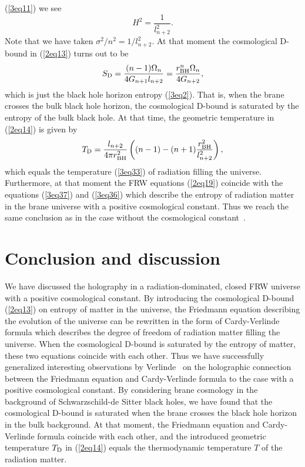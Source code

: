 \documentclass[a4paper,12pt]{article}
\begin{document}
(\ref{3eq11}) we see
\begin{equation}
H^2 =\frac{1}{l_{n+2}^2}.
\end{equation}
Note that we have taken $\sigma^2/n^2 =1/l_{n+2}^2$. At that moment
the cosmological D-bound in (\ref{2eq13}) turns out to be
\begin{equation}
S_{\rm D}= \frac{( n-1)\Omega_n}{4G_{n+1}l_{n+2}}
             =\frac{ r_{\rm BH}^n \Omega_n}{4G_{n+2}},
\end{equation}
which is just the black hole horizon entropy (\ref{3eq2}). That
is, when the brane  crosses the bulk black hole horizon,
the cosmological D-bound is saturated by the entropy of the bulk
black hole. At that time, the geometric temperature in
(\ref{2eq14}) is given by
\begin{equation}
T_{\rm D} =\frac{l_{n+2}}{4\pi r_{\rm BH}^2}\left ((n-1) -(n+1)
\frac{r_{\rm BH}^2}{l_{n+2}^2}\right),
\end{equation}
which equals  the temperature (\ref{3eq33}) of radiation filling
the universe. Furthermore,  at that moment the
FRW equations (\ref{2eq19}) coincide with the equations
(\ref{3eq37}) and (\ref{3eq36}) which describe the entropy of
radiation matter in the brane universe with a positive
cosmological constant. Thus we reach the same conclusion as in the case
without the cosmological constant~\cite{SV}.



\section{Conclusion and discussion}

We  have discussed the holography in a radiation-dominated, closed
FRW universe with a positive cosmological constant. By introducing the
cosmological D-bound (\ref{2eq13}) on entropy of matter in the universe,
the Friedmann equation describing the evolution of the universe can be 
rewritten in the form of Cardy-Verlinde formula which describes the degree
of freedom of radiation matter filling the universe. When the cosmological
D-bound is saturated by the entropy of matter, these two equations coincide
with each other. Thus we have successfully generalized  
interesting observations by Verlinde~\cite{Verl,SV} on the holographic 
connection between the Friedmann equation and Cardy-Verlinde formula
to the case with a positive cosmological constant. By considering brane 
cosmology in the background of Schwarzschild-de Sitter black holes, we have 
found that the cosmological D-bound is saturated when the brane crosses 
the black hole horizon in the bulk background. At that moment, the Friedmann
equation and Cardy-Verlinde formula coincide with each other, and the 
introduced geometric temperature $T_{\rm D}$ in (\ref{2eq14}) equals  the 
thermodynamic temperature $T$ of the radiation matter.
\end{document}
